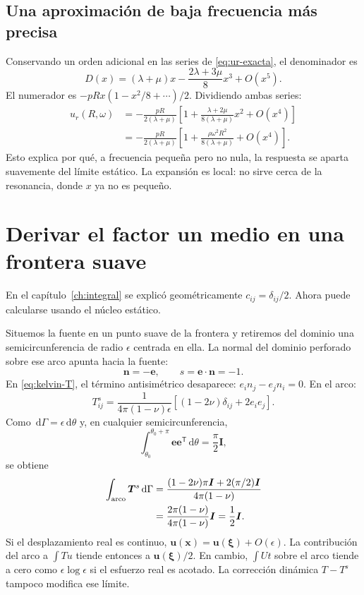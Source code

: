\documentclass[11pt,a4paper]{report}
\numberwithin{equation}{chapter}
\newcommand{\vect}[1]{\bm{#1}}
\newcommand{\dd}{\,\mathrm{d}}
\newcommand{\Id}{\vect I}
\begin{document}
\section{Una aproximaci\'on de baja frecuencia m\'as precisa}
Conservando un orden adicional en las series de
\eqref{eq:ur-exacta}, el denominador es
\begin{equation}
 D(x)=(\lambda+\mu)x-\frac{2\lambda+3\mu}{8}x^3+O(x^5).
\end{equation}
El numerador es $-pRx(1-x^2/8+\cdots)/2$.
Dividiendo ambas series:
\begin{align}
 u_r(R,\omega)
 &=-\frac{pR}{2(\lambda+\mu)}
 \left[1+\frac{\lambda+2\mu}{8(\lambda+\mu)}x^2+O(x^4)\right]\\
 &=-\frac{pR}{2(\lambda+\mu)}
 \left[1+\frac{\rho\omega^2R^2}{8(\lambda+\mu)}
              +O(x^4)\right].
\end{align}
Esto explica por qu\'e, a frecuencia peque\~na pero no nula,
la respuesta se aparta suavemente del l\'imite est\'atico.
La expansi\'on es local: no sirve cerca de la resonancia, donde
$x$ ya no es peque\~no.

\chapter{Derivar el factor un medio en una frontera suave}
\label{app:medio}
En el cap\'itulo~\ref{ch:integral} se explic\'o geom\'etricamente
$c_{ij}=\delta_{ij}/2$. Ahora puede calcularse usando el n\'ucleo
est\'atico.

Situemos la fuente en un punto suave de la frontera y retiremos del
dominio una semicircunferencia de radio $\epsilon$ centrada en ella.
La normal del dominio perforado sobre ese arco apunta hacia la fuente:
\begin{equation}
 \vect n=-\vect e,\qquad s=\vect e\cdot\vect n=-1.
\end{equation}
En \eqref{eq:kelvin-T}, el t\'ermino antisim\'etrico desaparece:
$e_in_j-e_jn_i=0$. En el arco:
\begin{equation}
 T^s_{ij}=\frac1{4\pi(1-\nu)\epsilon}
            [(1-2\nu)\delta_{ij}+2e_ie_j].
\end{equation}
Como $\dd\Gamma=\epsilon\dd\theta$ y, en cualquier semicircunferencia,
\begin{equation}
 \int_{\theta_0}^{\theta_0+\pi}\vect e\vect e^{\mathsf T}\dd\theta
   =\frac{\pi}{2}\Id,
\end{equation}
se obtiene
\begin{align}
 \int_{\rm arco}\vect T^s\dd\Gamma
 &=\frac{(1-2\nu)\pi\Id+2(\pi/2)\Id}{4\pi(1-\nu)}\\
 &=\frac{2\pi(1-\nu)}{4\pi(1-\nu)}\Id=\frac12\Id.
\end{align}
Si el desplazamiento real es continuo,
$\vect u(\vect x)=\vect u(\vect\xi)+O(\epsilon)$.
La contribuci\'on del arco a $\int T u$ tiende entonces a
$\vect u(\vect\xi)/2$.
En cambio, $\int U t$ sobre el arco tiende a cero como
$\epsilon\log\epsilon$ si el esfuerzo real es acotado.
La correcci\'on din\'amica $T-T^s$ tampoco modifica ese l\'imite.
\end{document}
